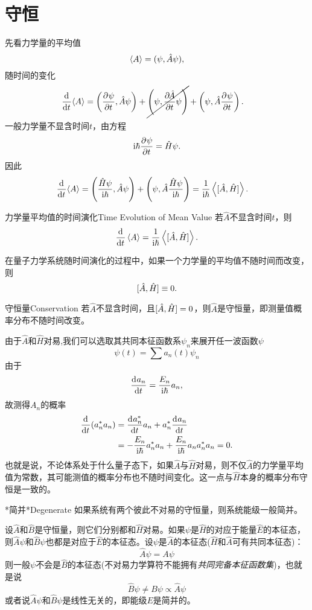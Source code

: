 \section{守恒}
先看力学量的平均值
\[
	\left\langle A\right\rangle=(\psi,\hat A\psi),
\]
随时间的变化
\begin{align*}
	\frac{\mathrm{d}^{{}}}{\mathrm{d}{t}^{{}}}{\left\langle A\right\rangle} & =\left(\frac{\partial^{{}}\psi}{\partial{t}^{{}}},\hat A\psi\right)+\cancel{\left(\psi,\frac{\partial^{{}}\!\hat A}{\partial{t}^{{}}}\psi\right)}+\left(\psi,\hat A\frac{\partial^{{}}\psi}{\partial{t}^{{}}}\right).
\end{align*}
一般力学量不显含时间$t$，由\Schr 方程
\[
	\mathrm{i}\hbar\frac{\partial^{{}}\psi}{\partial{t}^{{}}}=\hat H\psi.
\]
因此
\begin{align*}
	\dd t{\ave A} & =\kh{\frac{\hat H\psi}{\i\hbar},\hat A\psi}+\kh{\psi,\hat A\frac{\hat H\psi}{\i\hbar}}
	=\frac1{\i\hbar}\ave{\cmm AH}. %
\end{align*}
\begin{theorem}{力学量平均值的时间演化}{Time Evolution of Mean Value}
	若$\hat A$不显含时间$t$，则
	\begin{align}
		\frac{\mathrm{d}^{{}}}{\mathrm{d}{t}^{{}}}\left\langle A\right\rangle=\frac1{\mathrm{i}\hbar}\left\langle [\hat A,\hat H]\right\rangle.
	\end{align}
\end{theorem}
在量子力学系统随时间演化的过程中，如果一个力学量的平均值不随时间而改变，则
\[
	[\hat A,\hat H]\equiv 0.
\]
\begin{theorem}{守恒量}{Conservation}
	若$\hat A$不显含时间，且$[\hat A,\hat H]=0$，则$\hat A$是守恒量，即测量值概率分布不随时间改变。
\end{theorem}
由于$\hat A$和$\hat H$对易,我们可以选取其共同本征函数系$\psi_n$来展开任一波函数$\psi$
\[
	\psi(t)=\sum a_n(t)\psi_n
\]
由于
\[
	\frac{\mathrm{d}^{{}}a_n}{\mathrm{d}{t}^{{}}}=\frac{E_n}{\mathrm{i}\hbar}a_n,
\]
故测得$A_n$的概率
\begin{align*}
	\frac{\mathrm{d}^{{}}}{\mathrm{d}{t}^{{}}}(a_n^*a_n) & =\frac{\mathrm{d}^{{}}a_n^\ast}{\mathrm{d}{t}^{{}}}a_n+a_n^\ast\frac{\mathrm{d}^{{}}a_n}{\mathrm{d}{t}^{{}}}                                    \\
	                & =-\frac{E_n}{\mathrm{i}\hbar}a_n^\ast a_n+\frac{E_n}{\mathrm{i}\hbar}a_na_n^\ast a_n=0.
\end{align*}
也就是说，不论体系处于什么量子态下，如果$\hat A$与$\hat H$对易，则不仅$\hat A$的力学量平均值为常数，其可能测值的概率分布也不随时间变化。这一点与$\hat H$本身的概率分布守恒是一致的。

\begin{theorem}{*简并}{*Degenerate}
	如果系统有两个彼此不对易的守恒量，则系统能级一般简并。
\end{theorem}
设$\hat A$和$\hat B$是守恒量，则它们分别都和$\hat H$对易。如果$\psi$是$\hat H$的对应于能量$\hat E$的本征态，则$\hat A\psi$和$\hat B\psi$也都是对应于$\hat E$的本征态。设$\psi$是$\hat A$的本征态($\hat H$和$\hat A$可有共同本征态)：
\[
	\hat A\psi=A\psi
\]
则一般$\psi$不会是$\hat B$的本征态(不对易力学算符不能拥有\textit{共同完备本征函数集})，也就是说
\[
	\hat B\psi\neq B\psi\propto\hat A\psi
\]
或者说$\hat A\psi$和$\hat B\psi$是线性无关的，即能级$E$是简并的。

